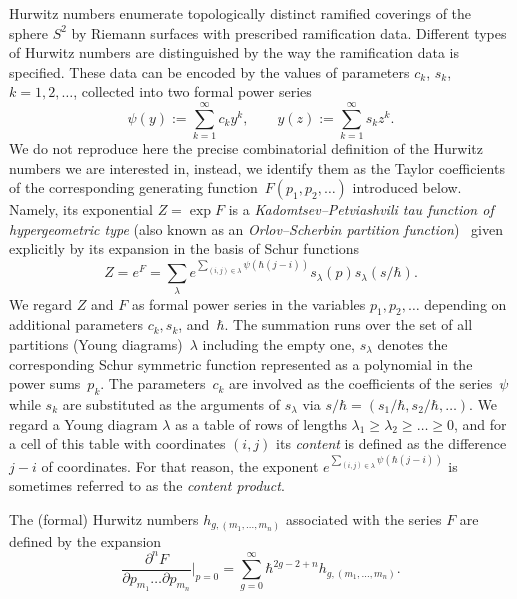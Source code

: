 \documentclass[JEP,XML,SOM,Unicode,NoEqCountersInSection,NoFloatCountersInSection]{cedram}
\theoremstyle{plain}
\theoremstyle{definition}
\theoremstyle{remark}
\begin{document}
Hurwitz numbers enumerate topologically distinct ramified coverings of the sphere $S^2$ by \hbox{Riemann} surfaces with prescribed ramification data. Different types of Hurwitz numbers are distinguished by the way the ramification data is specified. These data can be encoded by the values of parameters $c_k$, $s_k$, $k=1,2,\dots$, collected into two formal power series\vspace*{-5pt}
\begin{equation}\label{eq:psiY}
\psi(y):=\sum_{k=1}^\infty c_k y^k,\qquad
y(z):=\sum_{k=1}^\infty s_k z^k.
\end{equation}
We do not reproduce here the precise combinatorial definition of the Hurwitz numbers we are interested in, instead, we identify them as the Taylor coefficients of the corresponding generating function~$F(p_1,p_2,\dots)$ introduced below. Namely, its exponential $Z=\exp F$ is a \emph{Kadomtsev--Petviashvili tau function of hypergeometric type} (also known as an \emph{Orlov--Scherbin partition function})~\cite{Kharchev,OrlovScherbin,OrlovScherbin-2} given explicitly by its expansion in the basis of Schur functions
\begin{equation}\label{eq:OS}
Z=e^{F}=\sum_\lambda e^{\sum_{(i,j)\in\lambda}\psi(\hbar(j-i))}s_\lambda(p)s_\lambda(s/\hbar).
\end{equation}
We regard $Z$ and $F$ as formal power series in the variables $p_1,p_2,\dots$ depending on additional parameters $c_k, s_k$, and~$\hbar$.
The summation runs over the set of all partitions (Young diagrams)~$\lambda$ including the empty one, $s_\lambda$ denotes the corresponding Schur symmetric function represented as a polynomial in the power sums~$p_k$. The parameters~$c_k$ are involved as the coefficients of the series~$\psi$ while $s_k$ are substituted as the arguments of $s_\lambda$ via $s/\hbar=(s_1/\hbar,s_2/\hbar,\dots)$. We regard a Young diagram $\lambda$ as a table of rows of lengths $\lambda_1\ge\lambda_2\ge\dots\ge0$, and for a cell of this table with coordinates $(i,j)$ its \emph{content} is defined as the difference $j-i$ of coordinates. For that reason, the exponent $e^{\sum_{(i,j)\in\lambda}\psi(\hbar(j-i))}$ is sometimes referred to as the \emph{content product}.

The (formal) Hurwitz numbers $h_{g,(m_1,\dots,m_n)}$ associated with the series $F$ are defined by the expansion\vspace*{-5pt}
\begin{equation*}
\frac{\partial^n F}{\partial p_{m_1}\dots\partial p_{m_n}}\Big|_{p=0}=
\sum_{g=0}^\infty\hbar^{2g-2+n}h_{g,(m_1,\dots,m_n)}.
\end{equation*}
\end{document}
